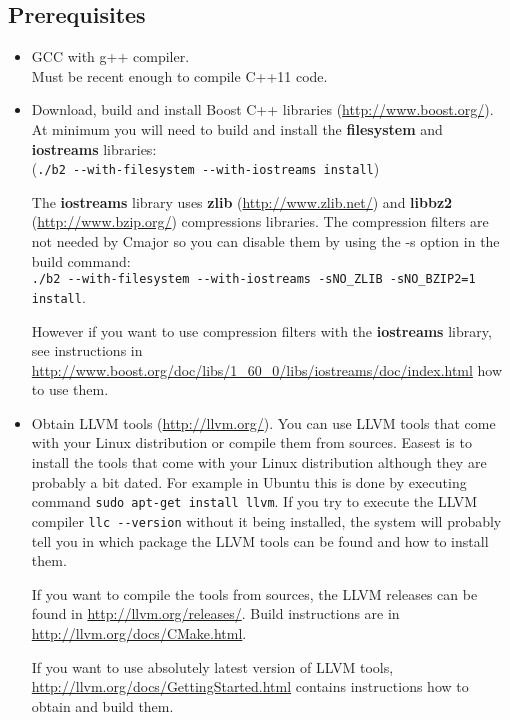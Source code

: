 \documentclass[oneside, a4paper, 11pt]{article}
\begin{document}
\subsection{Prerequisites}

\begin{itemize}

\item
GCC with g++ compiler.\\
Must be recent enough to compile C++11 code.

\item
Download, build and install Boost C++ libraries
(\url{http://www.boost.org/}).
At minimum you will need to build and install the
\textbf{filesystem} and \textbf{iostreams} libraries:\\
(\verb|./b2 --with-filesystem --with-iostreams install|)

The \textbf{iostreams} library uses \textbf{zlib} (\url{http://www.zlib.net/}) and
\textbf{libbz2} (\url{http://www.bzip.org/}) compressions libraries.
The compression filters are not needed by Cmajor so you can disable them by
using the -s option in the build command:\\
\verb|./b2 --with-filesystem --with-iostreams -sNO_ZLIB -sNO_BZIP2=1 install|.

However if you want to use compression filters with the \textbf{iostreams} library,
see instructions in \url{http://www.boost.org/doc/libs/1_60_0/libs/iostreams/doc/index.html}
how to use them.

\item
Obtain LLVM tools (\url{http://llvm.org/}).
You can use LLVM tools that come with your Linux distribution or compile them from sources.
Easest is to install the tools that come with your Linux distribution although they are
probably a bit dated. For example in Ubuntu this is done by executing command
\verb|sudo apt-get install llvm|. If you try to execute the LLVM compiler \verb|llc --version|
without it being installed, the system will probably tell you in which package the LLVM tools
can be found and how to install them.

If you want to compile the tools from sources, the LLVM releases can be found in \url{http://llvm.org/releases/}.
Build instructions are in \url{http://llvm.org/docs/CMake.html}.

If you want to use absolutely latest version of LLVM tools, \url{http://llvm.org/docs/GettingStarted.html}
contains instructions how to obtain and build them.

\end{itemize}
\end{document}
